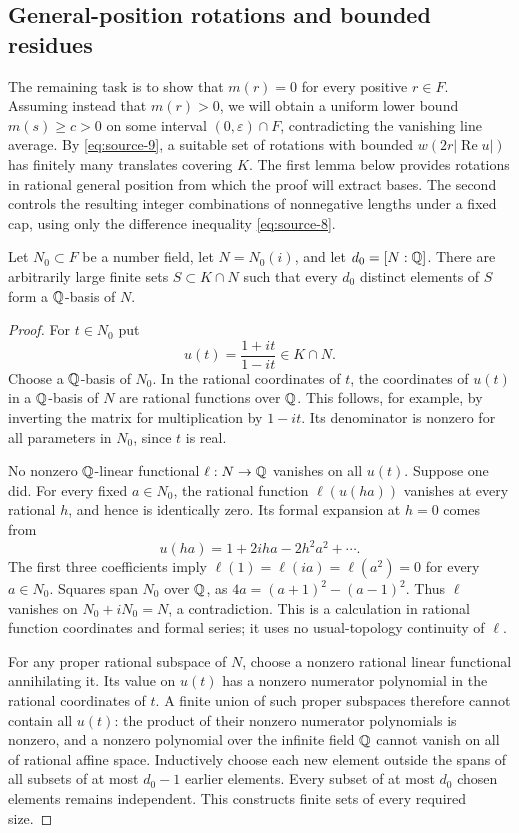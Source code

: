 \subsection{General-position rotations and bounded residues}

The remaining task is to show that $m(r)=0$ for every positive $r\in F$.
Assuming instead that $m(r)>0$, we will obtain a uniform lower bound
$m(s)\ge c>0$ on some interval $(0,\varepsilon)\cap F$, contradicting
the vanishing line average.  By \eqref{eq:source-9}, a suitable set
of rotations with bounded $w(2r|\operatorname{Re}u|)$ has finitely many
translates covering $K$.  The first lemma below provides rotations in
rational general position from which the proof will extract bases.
The second controls the resulting integer combinations of nonnegative
lengths under a fixed cap, using only the difference inequality
\eqref{eq:source-8}.

\begin{lemma}
\label{lem:rigidity-general-position}
Let $N_0\subset F$ be a number field, let $N=N_0(i)$, and let
$d_0=[N:\mathbb Q]$.  There are arbitrarily large finite sets $S\subset K\cap N$
such that every $d_0$ distinct elements of $S$ form a $\mathbb Q$-basis of $N$.
\end{lemma}

\begin{proof}
For $t\in N_0$ put
\[
 u(t)=\frac{1+it}{1-it}\in K\cap N.
\]
Choose a $\mathbb Q$-basis of $N_0$.  In the rational coordinates of $t$, the
coordinates of $u(t)$ in a $\mathbb Q$-basis of $N$ are rational functions over
$\mathbb Q$.  This follows, for example, by inverting the matrix for
multiplication by $1-it$.  Its denominator is nonzero for all parameters
in $N_0$, since $t$ is real.

No nonzero $\mathbb Q$-linear functional $\ell:N\to\mathbb Q$ vanishes on all $u(t)$.
Suppose one did.  For every fixed $a\in N_0$, the rational function
$\ell(u(ha))$ vanishes at every rational $h$, and hence is identically
zero.  Its formal expansion at $h=0$ comes from
\[
 u(ha)=1+2iha-2h^2a^2+\cdots.
\]
The first three coefficients imply
$\ell(1)=\ell(ia)=\ell(a^2)=0$ for every $a\in N_0$.  Squares span
$N_0$ over $\mathbb Q$, as
$4a=(a+1)^2-(a-1)^2$.  Thus $\ell$ vanishes on $N_0+iN_0=N$, a
contradiction.  This is a calculation in rational function coordinates
and formal series; it uses no usual-topology continuity of $\ell$.

For any proper rational subspace of $N$, choose a nonzero rational
linear functional annihilating it.  Its value on $u(t)$ has a nonzero
numerator polynomial in the rational coordinates of $t$.  A finite
union of such proper subspaces therefore cannot contain all $u(t)$:
the product of their nonzero numerator polynomials is nonzero, and a
nonzero polynomial over the infinite field $\mathbb Q$ cannot vanish on all
of rational affine space.  Inductively choose each new element outside
the spans of all subsets of at most $d_0-1$ earlier elements.  Every
subset of at most $d_0$ chosen elements remains independent.  This
constructs finite sets of every required size.
\end{proof}

